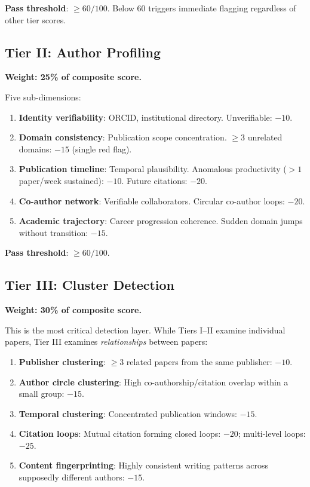 \documentclass[11pt]{article}
\begin{document}
\textbf{Pass threshold}: $\geq 60/100$. Below 60 triggers immediate flagging regardless 
of other tier scores.

\subsection{Tier II: Author Profiling}

\textbf{Weight: 25\% of composite score.}

Five sub-dimensions:
\begin{enumerate}
  \item \textbf{Identity verifiability}: ORCID, institutional directory. Unverifiable: $-10$.
  \item \textbf{Domain consistency}: Publication scope concentration. $\geq 3$ unrelated 
    domains: $-15$ (single red flag).
  \item \textbf{Publication timeline}: Temporal plausibility. Anomalous productivity 
    ($> 1$ paper/week sustained): $-10$. Future citations: $-20$.
  \item \textbf{Co-author network}: Verifiable collaborators. Circular co-author loops: $-20$.
  \item \textbf{Academic trajectory}: Career progression coherence. Sudden domain jumps 
    without transition: $-15$.
\end{enumerate}

\textbf{Pass threshold}: $\geq 60/100$.

\subsection{Tier III: Cluster Detection}

\textbf{Weight: 30\% of composite score.}

This is the most critical detection layer. While Tiers I--II examine individual papers, 
Tier III examines \textit{relationships} between papers:

\begin{enumerate}
  \item \textbf{Publisher clustering}: $\geq 3$ related papers from the same publisher: $-10$.
  \item \textbf{Author circle clustering}: High co-authorship/citation overlap within a 
    small group: $-15$.
  \item \textbf{Temporal clustering}: Concentrated publication windows: $-15$.
  \item \textbf{Citation loops}: Mutual citation forming closed loops: $-20$; multi-level 
    loops: $-25$.
  \item \textbf{Content fingerprinting}: Highly consistent writing patterns across 
    supposedly different authors: $-15$.
\end{enumerate}
\end{document}
